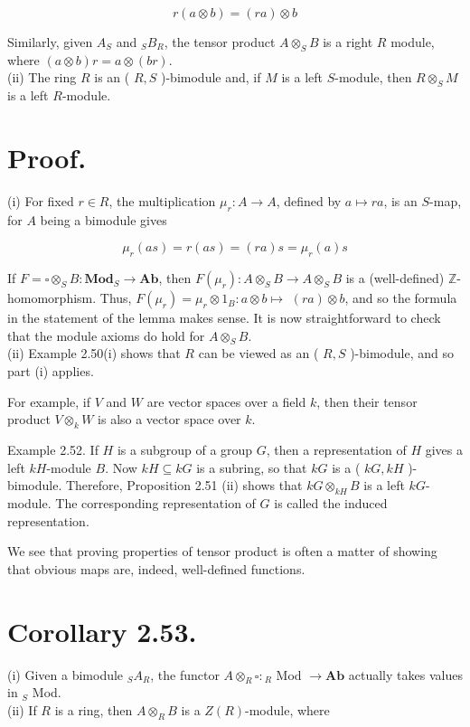 \documentclass[10pt, letterpaper]{article}
\begin{document}
$$
r(a \otimes b)=(r a) \otimes b
$$

Similarly, given $A_{S}$ and ${ }_{S} B_{R}$, the tensor product $A \otimes_{S} B$ is a right $R$ module, where $(a \otimes b) r=a \otimes(b r)$.\\
(ii) The ring $R$ is an ( $R, S$ )-bimodule and, if $M$ is a left $S$-module, then $R \otimes_{S} M$ is a left $R$-module.

\section*{Proof.}
(i) For fixed $r \in R$, the multiplication $\mu_{r}: A \rightarrow A$, defined by $a \mapsto r a$, is an $S$-map, for $A$ being a bimodule gives

$$
\mu_{r}(a s)=r(a s)=(r a) s=\mu_{r}(a) s
$$

If $F=\square \otimes_{S} B: \mathbf{M o d}_{S} \rightarrow \mathbf{A b}$, then $F\left(\mu_{r}\right): A \otimes_{S} B \rightarrow A \otimes_{S} B$ is a (well-defined) $\mathbb{Z}$-homomorphism. Thus, $F\left(\mu_{r}\right)=\mu_{r} \otimes 1_{B}: a \otimes b \mapsto$ $(r a) \otimes b$, and so the formula in the statement of the lemma makes sense. It is now straightforward to check that the module axioms do hold for $A \otimes_{S} B$.\\
(ii) Example 2.50(i) shows that $R$ can be viewed as an ( $R, S$ )-bimodule, and so part (i) applies.

For example, if $V$ and $W$ are vector spaces over a field $k$, then their tensor product $V \otimes_{k} W$ is also a vector space over $k$.

Example 2.52. If $H$ is a subgroup of a group $G$, then a representation of $H$ gives a left $k H$-module $B$. Now $k H \subseteq k G$ is a subring, so that $k G$ is a ( $k G, k H$ )-bimodule. Therefore, Proposition 2.51 (ii) shows that $k G \otimes_{k H} B$ is a left $k G$-module. The corresponding representation of $G$ is called the induced representation.

We see that proving properties of tensor product is often a matter of showing that obvious maps are, indeed, well-defined functions.

\section*{Corollary 2.53.}
(i) Given a bimodule ${ }_{S} A_{R}$, the functor $A \otimes_{R} \square:{ }_{R}$ Mod $\rightarrow \mathbf{A b}$ actually takes values in ${ }_{S}$ Mod.\\
(ii) If $R$ is a ring, then $A \otimes_{R} B$ is a $Z(R)$-module, where
\end{document}
